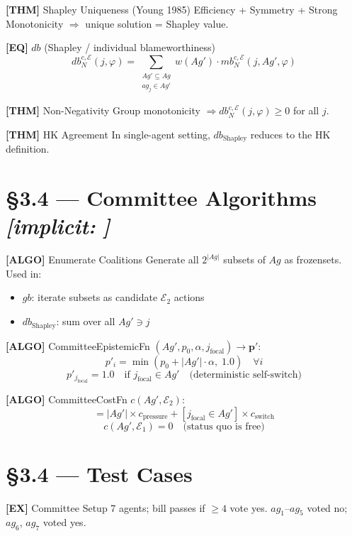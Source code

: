 \documentclass[10pt,a4paper]{article}
\newcommand{\EQ}[1]{\textcolor{eqcol}{\textbf{[EQ]}}\; #1}
\newcommand{\THM}[1]{\textcolor{thmcol}{\textbf{[THM]}}\; #1}
\newcommand{\ALGO}[1]{\textcolor{algocol}{\textbf{[ALGO]}}\; #1}
\newcommand{\EX}[1]{\textcolor{excol}{\textbf{[EX]}}\; #1}
\newcommand{\impl}[1]{\textit{[implicit:} #1\textit{]}}
\begin{document}
\THM{Shapley Uniqueness (Young 1985)} Efficiency + Symmetry + Strong Monotonicity $\Rightarrow$ unique solution = Shapley value.

\EQ{$db$ (Shapley / individual blameworthiness)}
$$db^{c,\mathcal{E}}_N(j,\varphi) = \sum_{\substack{Ag' \subseteq Ag \\ ag_j \in Ag'}} w(Ag')\cdot mb^{c,\mathcal{E}}_N(j,Ag',\varphi)$$

\THM{Non-Negativity} Group monotonicity $\Rightarrow db^{c,\mathcal{E}}_N(j,\varphi) \geq 0$ for all $j$.

\THM{HK Agreement} In single-agent setting, $db_{\text{Shapley}}$ reduces to the HK definition.

\section*{\S3.4 — Committee Algorithms \impl{}}

\ALGO{Enumerate Coalitions} Generate all $2^{|Ag|}$ subsets of $Ag$ as frozensets. Used in:
\begin{itemize}
  \item $gb$: iterate subsets as candidate $\mathcal{E}_2$ actions
  \item $db_{\text{Shapley}}$: sum over all $Ag' \ni j$
\end{itemize}

\ALGO{CommitteeEpistemicFn} $(Ag', p_0, \alpha, j_{\text{focal}}) \to \mathbf{p}'$:
$$p'_i = \min(p_0 + |Ag'| \cdot \alpha,\; 1{.}0) \quad \forall i$$
$$p'_{j_{\text{focal}}} = 1{.}0 \quad \text{if } j_{\text{focal}} \in Ag' \quad \text{(deterministic self-switch)}$$

\ALGO{CommitteeCostFn} $c(Ag', \mathcal{E}_2)$:
$$= |Ag'| \times c_{\text{pressure}} + [j_{\text{focal}} \in Ag'] \times c_{\text{switch}}$$
$$c(Ag', \mathcal{E}_1) = 0 \quad \text{(status quo is free)}$$

\section*{\S3.4 — Test Cases}

\EX{Committee Setup} 7 agents; bill passes if $\geq 4$ vote yes. $ag_1$–$ag_5$ voted no; $ag_6$, $ag_7$ voted yes.
\end{document}
